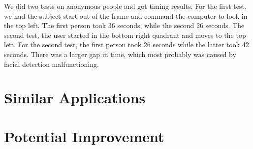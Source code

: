 \documentclass{article}
\begin{document}
We did two tests on anonymous people and got timing results.
For the first test, we had the subject start out of the frame and command the computer to look in the top left.
The first person took 36 seconds, while the second 26 seconds.
The second test, the user started in the bottom right quadrant and moves to the top left.
For the second test, the first person took 26 seconds while the latter took 42 seconds.
There was a larger gap in time, which most probably was caused by facial detection malfunctioning.


\section{Similar Applications}
\section{Potential Improvement}





\end{document}
